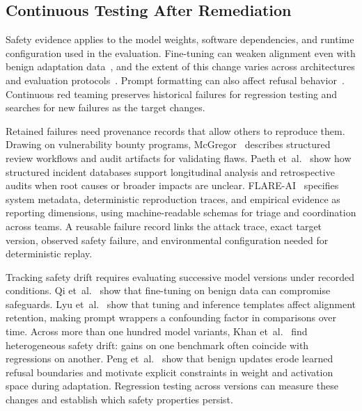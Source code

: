 \documentclass[review]{fcs}
\let\fcsOriginalCite\cite
\renewcommand{\cite}[1]{\allowbreak\fcsOriginalCite{#1}}
\begin{document}
\subsection{Continuous Testing After Remediation}

Safety evidence applies to the model weights, software dependencies, and runtime configuration used in the evaluation. Fine-tuning can weaken alignment even with benign adaptation data~\cite{qi2023finetuningalignedlanguagemodels,peng2026cwac}, and the extent of this change varies across architectures and evaluation protocols~\cite{khan2026safetydrift}. Prompt formatting can also affect refusal behavior~\cite{lyu2024keepingaligned}. Continuous red teaming preserves historical failures for regression testing and searches for new failures as the target changes.

Retained failures need provenance records that allow others to reproduce them. Drawing on vulnerability bounty programs, McGregor~\cite{mcgregor2025toerr} describes structured review workflows and audit artifacts for validating flaws. Paeth et~al.~\cite{paeth2025lessons} show how structured incident databases support longitudinal analysis and retrospective audits when root causes or broader impacts are unclear. FLARE-AI~\cite{longpre2026flareai} specifies system metadata, deterministic reproduction traces, and empirical evidence as reporting dimensions, using machine-readable schemas for triage and coordination across teams. A reusable failure record links the attack trace, exact target version, observed safety failure, and environmental configuration needed for deterministic replay.

Tracking safety drift requires evaluating successive model versions under recorded conditions. Qi et~al.~\cite{qi2023finetuningalignedlanguagemodels} show that fine-tuning on benign data can compromise safeguards. Lyu et~al.~\cite{lyu2024keepingaligned} show that tuning and inference templates affect alignment retention, making prompt wrappers a confounding factor in comparisons over time. Across more than one hundred model variants, Khan et~al.~\cite{khan2026safetydrift} find heterogeneous safety drift: gains on one benchmark often coincide with regressions on another. Peng et~al.~\cite{peng2026cwac} show that benign updates erode learned refusal boundaries and motivate explicit constraints in weight and activation space during adaptation. Regression testing across versions can measure these changes and establish which safety properties persist.
\end{document}
